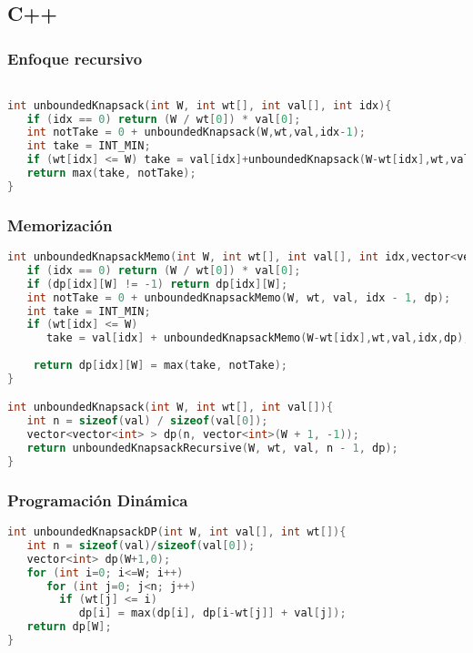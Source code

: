 \subsection{C++}

\subsubsection{Enfoque recursivo}
\begin{lstlisting}[language=C++]

int unboundedKnapsack(int W, int wt[], int val[], int idx){
   if (idx == 0) return (W / wt[0]) * val[0];
   int notTake = 0 + unboundedKnapsack(W,wt,val,idx-1);
   int take = INT_MIN;
   if (wt[idx] <= W) take = val[idx]+unboundedKnapsack(W-wt[idx],wt,val,idx);
   return max(take, notTake);
}
\end{lstlisting}

\subsubsection{Memorización}
\begin{lstlisting}[language=C++]
int unboundedKnapsackMemo(int W, int wt[], int val[], int idx,vector<vector<int> >& dp){
   if (idx == 0) return (W / wt[0]) * val[0];
   if (dp[idx][W] != -1) return dp[idx][W];
   int notTake = 0 + unboundedKnapsackMemo(W, wt, val, idx - 1, dp);
   int take = INT_MIN;
   if (wt[idx] <= W) 
      take = val[idx] + unboundedKnapsackMemo(W-wt[idx],wt,val,idx,dp);
	
    return dp[idx][W] = max(take, notTake);
}

int unboundedKnapsack(int W, int wt[], int val[]){
   int n = sizeof(val) / sizeof(val[0]);	
   vector<vector<int> > dp(n, vector<int>(W + 1, -1));
   return unboundedKnapsackRecursive(W, wt, val, n - 1, dp);
}
\end{lstlisting}

\subsubsection{Programación Dinámica}
\begin{lstlisting}[language=C++]
int unboundedKnapsackDP(int W, int val[], int wt[]){
   int n = sizeof(val)/sizeof(val[0]);
   vector<int> dp(W+1,0);
   for (int i=0; i<=W; i++)
      for (int j=0; j<n; j++)
        if (wt[j] <= i)
           dp[i] = max(dp[i], dp[i-wt[j]] + val[j]);
   return dp[W];
}
\end{lstlisting}
